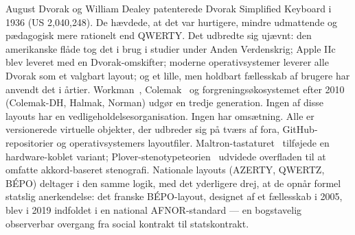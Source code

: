 \documentclass[10pt,letterpaper,twocolumn]{article}
\begin{document}
August Dvorak og William Dealey patenterede Dvorak Simplified Keyboard i 1936 (US 2{,}040{,}248). De hævdede, at det var hurtigere, mindre udmattende og pædagogisk mere rationelt end QWERTY. Det udbredte sig ujævnt: den amerikanske flåde tog det i brug i studier under Anden Verdenskrig; Apple IIc blev leveret med en Dvorak-omskifter; moderne operativsystemer leverer alle Dvorak som et valgbart layout; og et lille, men holdbart fællesskab af brugere har anvendt det i årtier. Workman~\citep{bucao2010workman}, Colemak~\citep{coleman2006colemak} og forgreningsøkosystemet efter 2010 (Colemak-DH, Halmak, Norman) udgør en tredje generation. Ingen af disse layouts har en vedligeholdelsesorganisation. Ingen har omsætning. Alle er versionerede virtuelle objekter, der udbreder sig på tværs af fora, GitHub-repositorier og operativsystemers layoutfiler. Maltron-tastaturet~\citep{malt1977keyboard} tilføjede en hardware-koblet variant; Plover-stenotypeteorien~\citep{knight2010plover} udvidede overfladen til at omfatte akkord-baseret stenografi. Nationale layouts (AZERTY, QWERTZ, BÉPO) deltager i den samme logik, med det yderligere drej, at de opnår formel statslig anerkendelse: det franske BÉPO-layout, designet af et fællesskab i 2005, blev i 2019 indfoldet i en national AFNOR-standard --- en bogstavelig observerbar overgang fra social kontrakt til statskontrakt.
\end{document}
